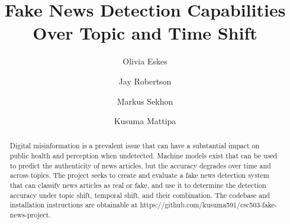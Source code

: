 \documentclass[sigconf]{acmart}
\begin{document}
\title{Fake News Detection Capabilities Over Topic and Time Shift}
\author{Olivia Eskes}
\author{Jay Robertson}

\author{Markus Sekhon}
\author{Kusuma Mattipa}

\begin{abstract}
Digital misinformation is a prevalent issue that can have a substantial impact on public health and perception when undetected. Machine models exist that can be used to predict the authenticity of news articles, but the accuracy degrades over time and across topics. The project seeks to create and evaluate a fake news detection system that can classify news articles as real or fake, and use it to determine the detection accuracy under topic shift, temporal shift, and their combination. The codebase and installation instructions are obtainable at https://github.com/kusuma591/csc503-fake-news-project.
\end{abstract}

\maketitle
\end{document}
